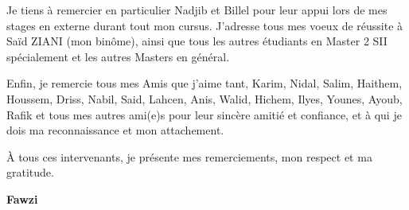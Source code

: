 Je tiens à  remercier en particulier Nadjib et Billel pour leur appui lors de mes stages en externe durant tout mon cursus.
J'adresse tous mes voeux de réussite à Saïd ZIANI (mon binôme), ainsi que tous les autres étudiants en Master 2 SII spécialement et les autres Masters en général.

Enfin, je remercie tous mes Amis que j’aime tant, Karim, Nidal, Salim, Haithem, Houssem, Driss, Nabil, Said, Lahcen, Anis, Walid, Hichem, Ilyes, Younes, Ayoub, Rafik et tous mes autres ami(e)s pour leur sincère amitié et confiance, et à qui je dois ma reconnaissance et mon attachement.

À tous ces intervenants, je présente mes remerciements, mon respect et ma gratitude.

\vspace{0.5cm}
\begin{center}
\Large
\hspace{12.5cm}
\textbf{Fawzi}
\end{center}